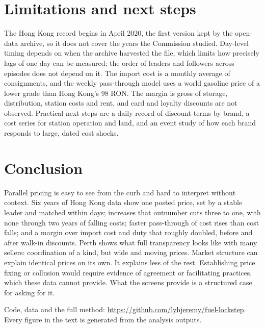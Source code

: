 \documentclass[11pt]{article}
\begin{document}
\section{Limitations and next steps}

The Hong Kong record begins in April 2020, the first version kept by the open-data archive, so it does not cover the years the Commission studied. Day-level timing depends on when the archive harvested the file, which limits how precisely lags of one day can be measured; the order of leaders and followers across \hkEpisodes{} episodes does not depend on it. The import cost is a monthly average of consignments, and the weekly pass-through model uses a world gasoline price of a lower grade than Hong Kong's 98 RON. The margin is gross of storage, distribution, station costs and rent, and card and loyalty discounts are not observed. Practical next steps are a daily record of discount terms by brand, a cost series for station operation and land, and an event study of how each brand responds to large, dated cost shocks.

\section{Conclusion}

Parallel pricing is easy to see from the curb and hard to interpret without context. Six years of Hong Kong data show one posted price, set by a stable leader and matched within days; increases that outnumber cuts three to one, with none through two years of falling costs; faster pass-through of cost rises than cost falls; and a margin over import cost and duty that roughly doubled, before and after walk-in discounts. Perth shows what full transparency looks like with many sellers: coordination of a kind, but wide and moving prices. Market structure can explain identical prices on its own. It explains less of the rest. Establishing price fixing or collusion would require evidence of agreement or facilitating practices, which these data cannot provide. What the screens provide is a structured case for asking for it.

\vspace{1em}
\noindent\footnotesize Code, data and the full method: \url{https://github.com/lyhjeremy/fuel-lockstep}. Every figure in the text is generated from the analysis outputs.
\end{document}
